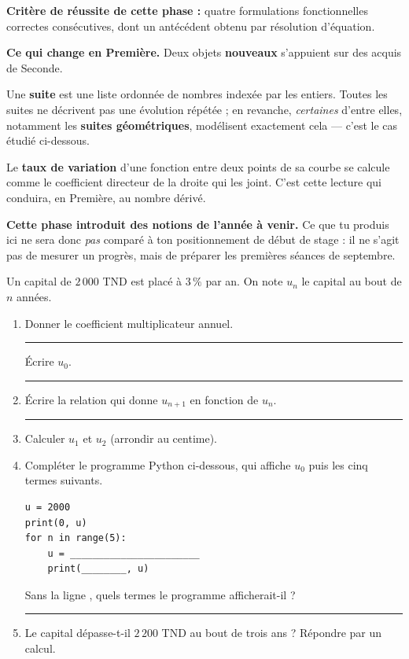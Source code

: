 \documentclass[10pt,a4paper]{article}
\begin{document}
\begin{successbox}\textbf{Critère de réussite de cette phase :} quatre formulations fonctionnelles correctes consécutives, dont un antécédent obtenu par résolution d'équation.\end{successbox}
\certline
\needspace{62mm}\par\vspace{3mm}

\begin{methodbox}
\textbf{Ce qui change en Première.} Deux objets \textbf{nouveaux} s'appuient sur des acquis de Seconde.
\par\smallskip
Une \textbf{suite} est une liste ordonnée de nombres indexée par les entiers. Toutes les suites ne décrivent
pas une évolution répétée ; en revanche, \emph{certaines} d'entre elles, notamment les \textbf{suites
géométriques}, modélisent exactement cela — c'est le cas étudié ci-dessous.
\par\smallskip
Le \textbf{taux de variation} d'une fonction entre deux points de sa courbe se calcule comme le coefficient
directeur de la droite qui les joint. C'est cette lecture qui conduira, en Première, au nombre dérivé.
\end{methodbox}
\begin{warningbox}\small
\textbf{Cette phase introduit des notions de l'année à venir.} Ce que tu produis ici ne sera donc
\emph{pas} comparé à ton positionnement de début de stage : il ne s'agit pas de mesurer un progrès,
mais de préparer les premières séances de septembre.
\end{warningbox}


Un capital de $2\,000$ TND est placé à $3\,\%$ par an. On note $u_n$ le capital au bout de $n$ années.
\begin{enumerate}
\item Donner le coefficient multiplicateur annuel. \rule{35mm}{0.32pt} \quad Écrire $u_0$. \rule{28mm}{0.32pt}
\item Écrire la relation qui donne $u_{n+1}$ en fonction de $u_n$. \rule{55mm}{0.32pt}
\item Calculer $u_1$ et $u_2$ (arrondir au centime).
\item Compléter le programme Python ci-dessous, qui affiche $u_0$ puis les cinq termes suivants.
\begin{lstlisting}
u = 2000
print(0, u)
for n in range(5):
    u = _______________________
    print(________, u)
\end{lstlisting}
\par\vspace{0.5mm}
Sans la ligne , quels termes le programme afficherait-il ? \rule{45mm}{0.32pt}
\item Le capital dépasse-t-il $2\,200$ TND au bout de trois ans ? Répondre par un calcul.
\end{enumerate}
\end{document}
